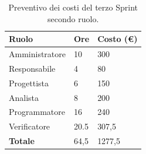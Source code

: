 \begin{table}[ht!]
	\centering
	\begin{tabular}{p{4cm} p{1cm} p{2cm}}
        \toprule
        \textbf{Ruolo} & \textbf{Ore} & \textbf{Costo (€)} \\
        \midrule
        Amministratore & 10 & 300 \\
        Responsabile & 4 & 80 \\
        Progettista & 6 & 150 \\
        Analista & 8 & 200 \\
        Programmatore & 16 & 240 \\
        Verificatore & 20.5 & 307,5 \\
        \bottomrule
        \textbf{Totale} & 64,5 & 1277,5
    \end{tabular}
    \caption{Preventivo dei costi del terzo Sprint secondo ruolo.}
	\label{table:Preventivo dei costi del terzo Sprint secondo ruolo}
\end{table}
